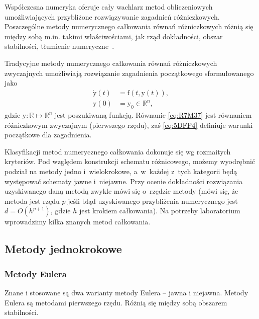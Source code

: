 \documentclass[paper=a4,DIV=12]{tmmlab}
\newcommand{\brm}[1]{\bm{\mathrm{#1}}}
\begin{document}
\begin{appendices}
Współczesna numeryka oferuje cały wachlarz metod obliczeniowych umożliwiających
przybliżone rozwiązywanie zagadnień różniczkowych. Poszczególne metody
numerycznego całkowania równań różniczkowych różnią się między sobą m.in.
takimi właściwościami, jak rząd dokładności, obszar stabilności, tłumienie
numeryczne~\cite{asher&petzold:1998:computer-methods}.

Tradycyjne metody numerycznego całkowania równań różniczkowych zwyczajnych
umożliwiają rozwiązanie zagadnienia początkowego sformułowanego jako
\begin{subequations}
\label{eq:L8KAD}
\begin{align}
  \dot{\brm{y}}\left(t\right) &= \brm{f}\left(t, \brm{y}(t)\right),
  \label{eq:R7M37}
  \\
  \brm{y}\left(0\right) &= \brm{y}_0 \in \mathbb{R}^n,
  \label{eq:5DFP4}
\end{align}
\end{subequations}
gdzie $\brm{y}: \mathbb{R} \mapsto \mathbb{R}^n$ jest poszukiwaną funkcją.
Równanie \eqref{eq:R7M37} jest równaniem różniczkowym zwyczajnym (pierwszego
rzędu), zaś \eqref{eq:5DFP4} definiuje warunki początkowe dla zagadnienia.

Klasyfikacji metod numerycznego całkowania dokonuje się wg rozmaitych
kryteriów. Pod względem konstrukcji schematu różnicowego, możemy wyodrębnić
podział na metody jedno i~wielokrokowe, a~w~każdej z~tych kategorii będą
występować schematy jawne i~niejawne. Przy ocenie dokładności rozwiązania
uzyskiwanego daną metodą zwykle mówi się o~rzędzie metody (mówi się, że metoda
jest rzędu $p$ jeśli błąd uzyskiwanego przybliżenia numerycznego jest $d =
O(h^{p+1})$, gdzie $h$ jest krokiem całkowania). Na potrzeby laboratorium
wprowadzimy kilka znanych metod całkowania.

\subsection{Metody jednokrokowe}
\label{sec:5BIFZ}

\subsubsection{Metody Eulera}
\label{sec:AN1EA}

Znane i stosowane są dwa warianty metody Eulera -- jawna i niejawna. Metody
Eulera są metodami pierwszego rzędu. Różnią się między sobą obszarem
stabilności.


\end{appendices}
\end{document}
